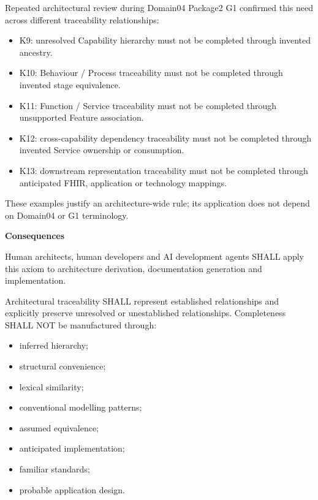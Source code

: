 Repeated architectural review during Domain04 Package2 G1 confirmed this
need across different traceability relationships:



\begin{itemize}


\item K9: unresolved Capability hierarchy must not be completed through
  invented ancestry.

\item K10: Behaviour / Process traceability must not be completed through
  invented stage equivalence.

\item K11: Function / Service traceability must not be completed through
  unsupported Feature association.

\item K12: cross-capability dependency traceability must not be completed
  through invented Service ownership or consumption.

\item K13: downstream representation traceability must not be completed through
  anticipated FHIR, application or technology mappings.

\end{itemize}


These examples justify an architecture-wide rule; its application does
not depend on Domain04 or G1 terminology.



\par\medskip\textbf{Consequences}\par


Human architects, human developers and AI development agents SHALL apply
this axiom to architecture derivation, documentation generation and
implementation.



Architectural traceability SHALL represent established relationships and
explicitly preserve unresolved or unestablished relationships.
Completeness SHALL NOT be manufactured through:



\begin{itemize}


\item inferred hierarchy;

\item structural convenience;

\item lexical similarity;

\item conventional modelling patterns;

\item assumed equivalence;

\item anticipated implementation;

\item familiar standards;

\item probable application design.

\end{itemize}


